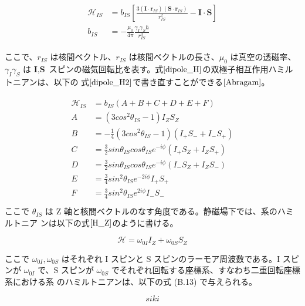 \begin{align}
  \begin{aligned}
    \mathcal{H}_{IS}&=b_{IS}\left[\frac{3(\textbf{I}\cdot \textbf{r}_{IS})(\textbf{S}\cdot \textbf{r}_{IS})}{r^2_{IS}}-\textbf{I}\cdot \textbf{S} \right]\\
    b_{IS}&=-\frac{\mu_0}{4\pi}\frac{\gamma_I \gamma_S \hbar}{r^3_{IS}}
    \label{dipole_H}
  \end{aligned}
\end{align}

ここで、$r_{IS}$ は核間ベクトル、$r_{IS}$ は核間ベクトルの長さ、$\mu_0$ は真空の透磁率、$\gamma_I\gamma_S$ は
$\textbf{I},\textbf{S}$ スピンの磁気回転比を表す。式$\ref{dipole_H}$の双極子相互作用ハミルトニアンは、以下の
式$\ref{dipole_H2}$で書き直すことができる$\cite{Abragam}$。


\begin{align}
  \begin{aligned}
    \mathcal{H}_{IS}&=b_{IS}(A+B+C+D+E+F)\\
    A&=(3cos^2\theta_{IS}-1)I_ZS_Z\\
    B&=-\frac{1}{4}(3cos^2\theta_{IS}-1)(I_+S_-+I_-S_+)\\
    C&=\frac{3}{2}sin\theta_{IS}cos\theta_{IS}e^{-i\phi}(I_+S_Z+I_ZS_+)\\
    D&=\frac{3}{2}sin\theta_{IS}cos\theta_{IS}e^{-i\phi}(I_-S_Z+I_ZS_-)\\
    E&=\frac{3}{4}sin^2\theta_{IS}e^{-2i\phi}I_+S_+\\
    F&=\frac{3}{4}sin^2\theta_{IS}e^{2i\phi}I_-S_-\\
    \label{dipole_H2}
  \end{aligned}
\end{align}
ここで $\theta_{IS}$ は Z 軸と核間ベクトルのなす角度である。静磁場下では、系のハミルトニア
ンは以下の式$\ref{H_Z}$のように書ける。

\begin{equation}
  \mathcal{H}=\omega_{0I}I_Z+\omega_{0S}S_Z
  \label{H_Z}
\end{equation}

ここで $\omega_{0I} , \omega_{0S}$ はそれぞれ I スピンと S スピンのラーモア周波数である。I スピンが
$\omega_{0I}$ で、S スピンが $\omega_{0S}$ でそれぞれ回転する座標系、すなわち二重回転座標系における系
のハミルトニアンは、以下の式 (B.13) で与えられる。

\begin{equation}
  siki
\end{equation}

